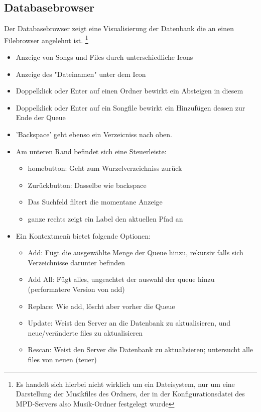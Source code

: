 \subsection{Databasebrowser}
Der Databasebrowser zeigt eine Visualisierung der Datenbank die an einen Filebrowser angelehnt ist.
\footnote{Es handelt sich hierbei nicht wirklich um ein Dateisystem, nur um eine Darstellung der Musikfiles des Ordners, der in der Konfigurationsdatei des MPD-Servers also Musik-Ordner festgelegt wurde}
\begin{itemize}
   \item Anzeige von Songs und Files durch unterschiedliche Icons
   \item Anzeige des "Dateinamen" unter dem Icon
   \item Doppelklick oder Enter auf einen Ordner bewirkt ein Absteigen in diesem
   \item Doppelklick oder Enter auf ein Songfile bewirkt ein Hinzufügen dessen zur Ende der Queue
   \item 'Backspace' geht ebenso ein Verzeicniss nach oben.
   \item Am unteren Rand befindet sich eine Steuerleiste:
   \begin{itemize}
     \item homebutton: Geht zum Wurzelverzeichniss zurück
     \item Zurückbutton: Dasselbe wie backspace
     \item Das Suchfeld filtert die momentane Anzeige
     \item ganze rechts zeigt ein Label den aktuellen Pfad an
   \end{itemize}
   \item Ein Kontextmenü bietet folgende Optionen:
   \begin{itemize}
     \item Add: Fügt die ausgewählte Menge der Queue hinzu, rekursiv falls sich Verzeichnisse darunter befinden
     \item Add All: Fügt alles, ungeachtet der auswahl der queue hinzu (performatere Version von add)
     \item Replace: Wie add, löscht aber vorher die Queue
     \item Update: Weist den Server an die Datenbank zu aktualisieren, und neue/veränderte files zu aktualisieren
     \item Rescan: Weist den Server die Datenbank zu aktualisieren; untersucht alle files von neuen (teuer)
   \end{itemize}
\end{itemize}

